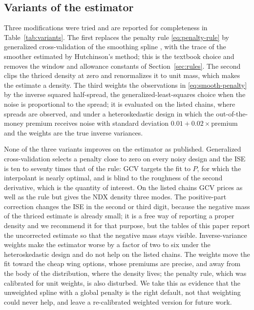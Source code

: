 \documentclass[preprint,12pt,authoryear,times]{elsarticle}
\begin{document}
\subsection{Variants of the estimator}
\label{sec:variants}

Three modifications were tried and are reported for completeness in Table~\ref{tab:variants}. The first replaces the penalty rule \eqref{eq:penalty-rule} by generalized cross-validation of the smoothing spline \citep{wahba1977,green1994}, with the trace of the smoother estimated by Hutchinson's method; this is the textbook choice and removes the window and allowance constants of Section~\ref{sec:rules}. The second clips the thriced density at zero and renormalizes it to unit mass, which makes the estimate a density. The third weights the observations in \eqref{eq:smooth-penalty} by the inverse squared half-spread, the generalized-least-squares choice when the noise is proportional to the spread; it is evaluated on the listed chains, where spreads are observed, and under a heteroskedastic design in which the out-of-the-money premium receives noise with standard deviation \(0.01+0.02\times\)premium and the weights are the true inverse variances.

\begin{table}[H]
\centering
\caption{Variants of the estimator. Simulation panel: mean ISE (\(\times 10^4\)) over one hundred replications at \(\mathrm{sd}=0.01\) (implied-volatility noise) and under the heteroskedastic price-noise design; ``+'' is the positive-part renormalized estimate, ``w'' the inverse-variance weighted spline. Listed panel: nested hold-out in half-spreads and number of modes.}
\label{tab:variants}
\footnotesize
\setlength{\tabcolsep}{3pt}
\end{table}

None of the three variants improves on the estimator as published. Generalized cross-validation selects a penalty close to zero on every noisy design and the ISE is ten to seventy times that of the rule: GCV targets the fit to \(P\), for which the interpolant is nearly optimal, and is blind to the roughness of the second derivative, which is the quantity of interest. On the listed chains GCV prices as well as the rule but gives the NDX density three modes. The positive-part correction changes the ISE in the second or third digit, because the negative mass of the thriced estimate is already small; it is a free way of reporting a proper density and we recommend it for that purpose, but the tables of this paper report the uncorrected estimate so that the negative mass stays visible. Inverse-variance weights make the estimator worse by a factor of two to six under the heteroskedastic design and do not help on the listed chains. The weights move the fit toward the cheap wing options, whose premiums are precise, and away from the body of the distribution, where the density lives; the penalty rule, which was calibrated for unit weights, is also disturbed. We take this as evidence that the unweighted spline with a global penalty is the right default, not that weighting could never help, and leave a re-calibrated weighted version for future work.
\end{document}

